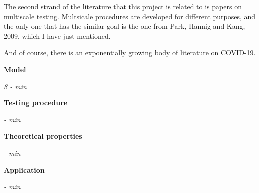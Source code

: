 \documentclass[a4paper,12pt]{article}
\begin{document}
The second strand of the literature that this project is related to is papers on multiscale testing. Multsicale procedures are developed for different purposes, and the only one that has the similar goal is the one from Park, Hannig and Kang, 2009, which I have just mentioned.

And of course, there is an exponentially growing body of literature on COVID-19.

\textbf{Model}

\emph{8 -  min}

\textbf{Testing procedure}

\emph{ -  min}

\textbf{Theoretical properties}

\emph{ -  min}

\textbf{Application}

 \emph{ -  min}
\end{document}

